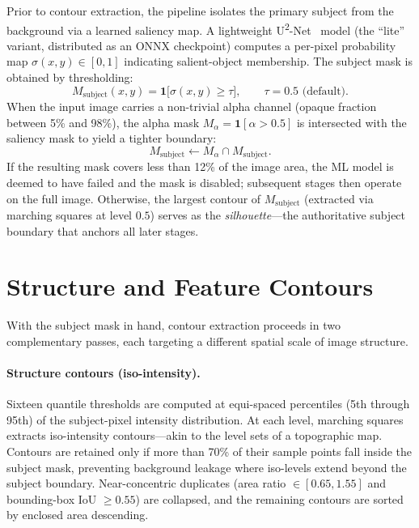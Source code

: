 \documentclass[12pt,a4paper]{report}
\theoremstyle{thms}
\theoremstyle{defns}
\begin{document}
Prior to contour extraction, the pipeline isolates the primary subject from the background via a learned saliency map. A lightweight U\textsuperscript{2}-Net~\cite{u2net} model (the ``lite'' variant, distributed as an ONNX checkpoint) computes a per-pixel probability map $\sigma(x,y) \in [0,1]$ indicating salient-object membership. The subject mask is obtained by thresholding:
\begin{equation}
    M_{\mathrm{subject}}(x,y) = \mathbf{1}\!\bigl[\sigma(x,y) \geq \tau\bigr], \qquad \tau = 0.5 \text{ (default)}.
\end{equation}
When the input image carries a non-trivial alpha channel (opaque fraction between 5\% and 98\%), the alpha mask $M_\alpha = \mathbf{1}[\alpha > 0.5]$ is intersected with the saliency mask to yield a tighter boundary:
\begin{equation}
    M_{\mathrm{subject}} \leftarrow M_\alpha \cap M_{\mathrm{subject}}.
\end{equation}
If the resulting mask covers less than 12\% of the image area, the ML model is deemed to have failed and the mask is disabled; subsequent stages then operate on the full image. Otherwise, the largest contour of $M_{\mathrm{subject}}$ (extracted via marching squares at level $0.5$) serves as the \emph{silhouette}—the authoritative subject boundary that anchors all later stages.

\section{Structure and Feature Contours}
\label{sec:structure_feature_contours}

With the subject mask in hand, contour extraction proceeds in two complementary passes, each targeting a different spatial scale of image structure.

\paragraph{Structure contours (iso-intensity).} Sixteen quantile thresholds are computed at equi-spaced percentiles (5th through 95th) of the subject-pixel intensity distribution. At each level, marching squares extracts iso-intensity contours—akin to the level sets of a topographic map. Contours are retained only if more than 70\% of their sample points fall inside the subject mask, preventing background leakage where iso-levels extend beyond the subject boundary. Near-concentric duplicates (area ratio $\in [0.65, 1.55]$ and bounding-box IoU $\geq 0.55$) are collapsed, and the remaining contours are sorted by enclosed area descending.
\end{document}
